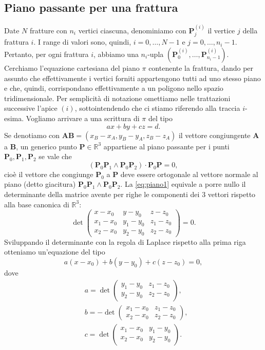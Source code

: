\documentclass[a4paper]{article}
\newcommand{\B}{\mathbf}
\begin{document}
\subsection{Piano passante per una frattura}
Date $N$ fratture con $n_i$ vertici ciascuna, denominiamo con $\B{P}^{(i)}_j$ il vertice $j$ della frattura $i$. I range di valori sono, quindi, $i=0,\dots,N-1$ e $j=0,\dots,n_i-1$. Pertanto, per ogni frattura $i$, abbiamo una $n_i$-upla $(\B{P}^{(i)}_0,\dots,\B{P}^{(i)}_{n_i-1})$. Cerchiamo l'equazione cartesiana del piano $\pi$ contenente la frattura, dando per assunto che effettivamente i vertici forniti appartengono tutti ad uno stesso piano e che, quindi, corrispondano effettivamente a un poligono nello spazio tridimensionale. Per semplicità di notazione omettiamo nelle trattazioni successive l'apice $(i)$, sottointendendo che ci stiamo riferendo alla traccia $i$-esima. Vogliamo arrivare a una scrittura di $\pi$ del tipo $$ax+by+cz=d.$$
Se denotiamo con ${\B{A}\B{B}}=(x_B-x_A,y_B-y_A,z_B-z_A)$ il vettore congiungente $\B{A}$ a $\B{B}$, un generico punto $\B{P}\in\mathbb{R}^3$ appartiene al piano passante per i punti $\B{P}_0,\B{P}_1,\B{P}_2$ se vale che 
\begin{equation}\label{eq:piano1}
(\B{P}_0\B{P}_1\wedge \B{P}_0\B{P}_2)\cdot \B{P}_0\B{P}=0,
\end{equation} 
cioè il vettore che congiunge $\B{P}_0$ a $\B{P}$ deve essere ortogonale al vettore normale al piano (detto giacitura) $\B{P}_0\B{P}_1\wedge \B{P}_0\B{P}_2$. 
La \eqref{eq:piano1} equivale a porre nullo il determinante della matrice avente per righe le componenti dei $3$ vettori rispetto alla base canonica di $\mathbb{R}^3$: 
$$
\det\begin{pmatrix} x-x_0 & y-y_0 & z-z_0 \\ x_1-x_0 & y_1-y_0 & z_1-z_0 \\x_2-x_0 & y_2-y_0 & z_2-z_0 \end{pmatrix}=0.
$$
Sviluppando il determinante con la regola di Laplace rispetto alla prima riga otteniamo un'equazione del tipo 
\begin{equation}\label{eq:piano2}
a\left(x-x_0\right)+b\left(y-y_0\right)+c\left(z-z_0\right)=0,
\end{equation} 
dove 
\[
\begin{aligned}
& a=\operatorname{det}\left(\begin{array}{ll} y_1-y_0 & z_1-z_0 \\ y_2-y_0 & z_2-z_0 \end{array}\right), \\
& b=-\operatorname{det}\left(\begin{array}{ll}x_1-x_0& z_1-z_0 \\ x_2-x_0 & z_2-z_0 \end{array}\right),\\
& c=\operatorname{det}\left(\begin{array}{ll} x_1-x_0 & y_1-y_0 \\ x_2-x_0 & y_2-y_0 \end{array}\right). 
\end{aligned}
\]
\end{document}
